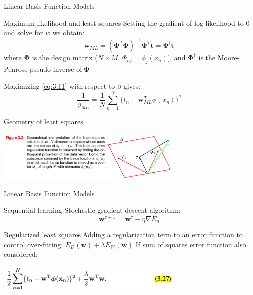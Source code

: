 \documentclass[9pt]{beamer}
\begin{document}
\begin{frame}{Linear Basis Function Models}
    \begin{alertblock}{Maximum likelihood and least squares}
        Setting the gradient of log likelihood to $0$ and solve for $w$ we obtain:
        \[ \mathbf{w}_{ML} = (\mathbf{\Phi}^T \mathbf{\Phi})^{-1} \mathbf{\Phi}^T \mathbf{t} = \mathbf{\Phi}^\dagger \mathbf{t} \tag{3.15} \label{eq:3.15} \]
        where $\mathbf{\Phi}$ is the design matrix ($N \times M$, $\Phi_{nj} = \phi_j(x_n)$), and $\mathbf{\Phi}^\dagger$ is the Moore-Penrose pseudo-inverse of $\mathbf{\Phi}$

        Maximizing \eqref{eq:3.11} with respect to $\beta$ gives:
        \[ \frac{1}{\beta_{ML}} = \frac{1}{N} \sum_{n=1}^{N} \{t_n - \mathbf{w}_{ML}^T \phi(x_n)\}^2 \]
    \end{alertblock}
    \begin{alertblock}{Geometry of least squares}
        \begin{center}
            \includegraphics[width=9cm]{../images/Bishop_MachineLearning_Figure3-2.png} %
        \end{center}
    \end{alertblock}
\end{frame}

\begin{frame}{Linear Basis Function Models}
    \begin{alertblock}{Sequential learning}
        Stochastic gradient descent algorithm:
        \[ \mathbf{w}^{\tau + 1} = \mathbf{w}^{\tau} - \eta \nabla E_{n} \tag{3.22} \label{eq:3.22} \]
    \end{alertblock}
    \begin{alertblock}{Regularized least squares}
        Adding a regularization term to an error function to control over-fitting: $E_D(\mathbf{w}) + \lambda E_W(\mathbf{w})$
        If sum of squares error function also considered:
        \begin{center}
            \includegraphics[width=9cm]{../images/Bishop_MachineLearning_Eq3-27.png} %
        \end{center}
    \end{alertblock}
\end{frame}
\end{document}

